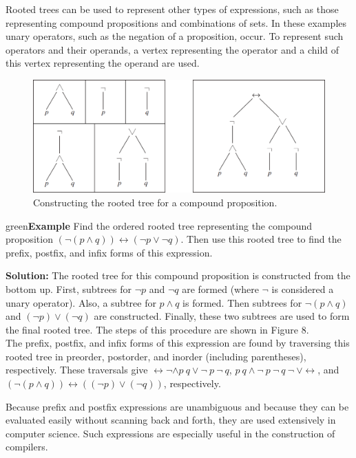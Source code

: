 \documentclass{article}
\newenvironment{example}{\begin{mybox}{green}{\textbf{Example}}}{\end{mybox}}
\begin{document}
Rooted trees can be used to represent other types of expressions, such as those representing compound propositions and combinations of sets. In these examples unary operators, such as the negation of a proposition, occur. To represent such operators and their operands, a vertex representing the operator and a child of this vertex representing the operand are used.


\begin{figure}[h!]
    \centering
    \includegraphics[width=.8\textwidth]{img/ch11.3-figure14.png}
    \caption{Constructing the rooted tree for a compound proposition.}
    \label{fig:ch_11.3}
\end{figure}


\begin{example}
Find the ordered rooted tree representing the compound proposition $(\neg(p \land q)) \leftrightarrow (\neg p \lor \neg q)$. Then use this rooted tree to find the prefix, postfix, and infix forms of this expression.

\textbf{Solution:}
The rooted tree for this compound proposition is constructed from the bottom up. First, subtrees for $\neg p$ and $\neg q$ are formed (where $\neg$ is considered a unary operator). Also, a subtree for $p \land q$ is formed. Then subtrees for $\neg (p \land q)$ and $(\neg p) \lor (\neg q)$ are constructed. Finally, these two subtrees are used to form the final rooted tree. The steps of this procedure are shown in Figure 8.\\

The prefix, postfix, and infix forms of this expression are found by traversing this rooted tree in preorder, postorder, and inorder (including parentheses), respectively. These traversals give $\leftrightarrow \neg \land p\ q \lor \neg\  p\ \neg\ q$, $p\ q \land \neg\ p\ \neg\ q\ \neg\ \lor \leftrightarrow$, and $(\neg  (p \land q)) \leftrightarrow ((\neg p) \lor (\neg q))$, respectively.
\end{example}

Because prefix and postfix expressions are unambiguous and because they can be evaluated easily without scanning back and forth, they are used extensively in computer science. Such expressions are especially useful in the construction of compilers.
\end{document}
